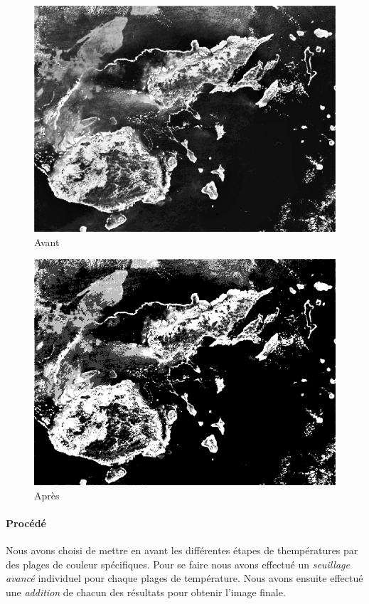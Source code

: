 	\begin{figure}[h]
	\centering
		\begin{multicols}{2}
		\includegraphics[scale=0.55]{images/HD215497.png}
		Avant

		\includegraphics[scale=0.55]{images/MissionB3.png}
		Après
		\end{multicols}
	\end{figure}
	\vspace{-0.9cm}

	\paragraph{Procédé}	
		Nous avons choisi de mettre en avant les différentes étapes de thempératures par des plages de couleur spécifiques. Pour se faire nous avons effectué un \emph{seuillage avancé} individuel pour chaque plages de température. Nous avons ensuite effectué une \emph{addition} de chacun des résultats pour obtenir l'image finale. 